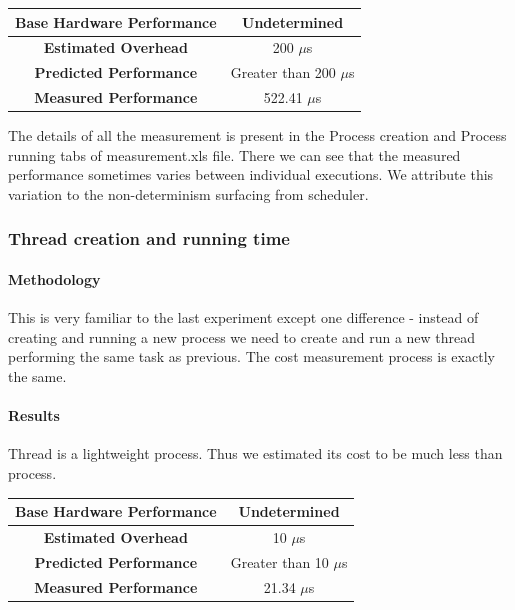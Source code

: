 \documentclass[conference]{IEEEtran}
\begin{document}
\begin{center}
\begin{tabular}{ |c|c| } 
  \hline
  \textbf{Base Hardware Performance} & Undetermined \\ 
  \hline
  \textbf{Estimated Overhead} &  200 $\mu$s \\ 
  \hline
  \textbf{Predicted Performance} & Greater than 200 $\mu$s \\ 
  \hline
  \textbf{Measured Performance} & 522.41 $\mu$s \\ 
  \hline
\end{tabular}
\end{center}

The details of all the measurement is present in the Process creation and Process running tabs of measurement.xls file. There we can see that the measured performance sometimes varies between individual executions. We attribute this variation to the non-determinism surfacing from scheduler.



\subsubsection{Thread creation and running time}

\paragraph{Methodology}

This is very familiar to the last experiment except one difference - instead of creating and running a new process we need to create and run a new thread performing the same task as previous. 
The cost measurement process is exactly the same.

\paragraph{Results}

Thread is a lightweight process. Thus we estimated its cost to be much less than process.

\begin{center}
\begin{tabular}{ |c|c| } 
  \hline
  \textbf{Base Hardware Performance} & Undetermined \\ 
  \hline
  \textbf{Estimated Overhead} &  10 $\mu$s \\ 
  \hline
  \textbf{Predicted Performance} & Greater than 10 $\mu$s \\ 
  \hline
  \textbf{Measured Performance} & 21.34 $\mu$s \\ 
  \hline
\end{tabular}
\end{center}
\end{document}
